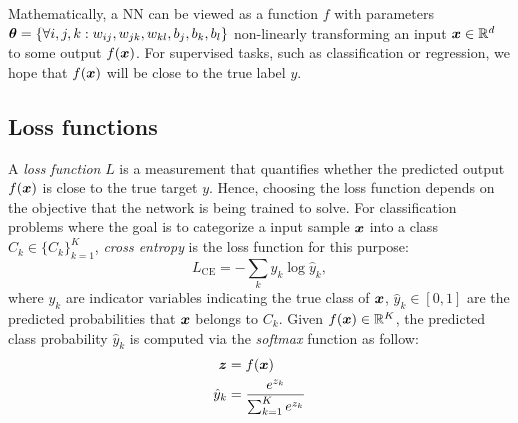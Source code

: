 %




 Mathematically, a NN can be viewed as a function $f$ with parameters $\patvector{\theta} = \{\forall i,j,k : w_{ij}, w_{jk}, w_{kl}, b_j, b_k, b_l \}$  non-linearly transforming an input $\boldsymbol{x} \in \mathbb{R}^d $ to some output $f(\boldsymbol{x})$. For supervised tasks, such as classification or regression, we hope that $f(\boldsymbol{x})$ will be close to the true label $y$.
%
%
%



\subsection{Loss functions}
A \textit{loss function} $L$  is a measurement that quantifies whether the predicted output $f(\boldsymbol{x})$ is close to the true target $y$. Hence, 
choosing the loss function depends on the objective that the network is being trained to solve. For classification problems where the goal is to categorize a input sample $\boldsymbol{x}$ into a class $C_k \in \{ C_k\}_{k=1}^K$, \textit{cross entropy} is the loss function for this purpose:
$$
L_{\text{CE}} = - \sum_{k} y_k \log \hat{y}_k,
$$
where $y_k$ are indicator variables indicating the true class of $\boldsymbol{x}$, $\hat{y}_k \in [0, 1]$ are the predicted probabilities that $\boldsymbol{x}$ belongs to $C_k$. Given $f(\boldsymbol{x}) \in \mathbb{R}^{K}$, the predicted class probability $\hat{y}_k$  is computed via the \textit{softmax} function as follow:
\begin{align*}
\patvector{z} &=  f(\x) \\
\hat{y}_k &= \frac{e^{z_k}}{ \sum_{k=1}^K{e^{z_k}} }
\end{align*}



